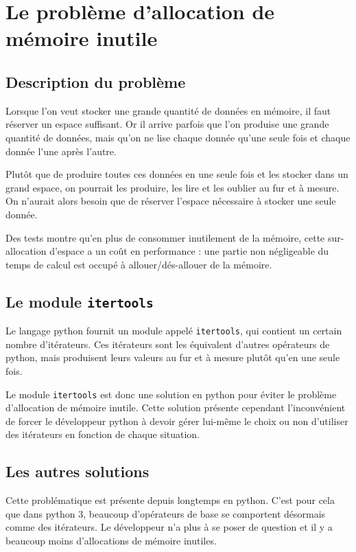 \documentclass[a4paper]{article}
\begin{document}
\section*{Le problème d'allocation de mémoire inutile}

\subsection*{Description du problème}

Lorsque l'on veut stocker une grande quantité de données en mémoire,
il faut réserver un espace suffisant. Or il arrive parfois que l'on
produise une grande quantité de données, mais qu'on ne lise chaque
donnée qu'une seule fois et chaque donnée l'une après l'autre. 

Plutôt que de produire toutes ces données en une seule fois et les
stocker dans un grand espace, on pourrait les produire, les lire et
les oublier au fur et à mesure. On n'aurait alors besoin que de
réserver l'espace nécessaire à stocker une seule donnée.

Des tests montre qu'en plus de consommer inutilement de la mémoire,
cette sur-allocation d'espace a un coût en performance : une partie non
négligeable du temps de calcul est occupé à allouer/dés-allouer de la
mémoire.

\subsection*{Le module \texttt{itertools}}

Le langage python fournit un module appelé \texttt{itertools}, qui contient un
certain nombre d'itérateurs. Ces itérateurs sont les équivalent
d'autres opérateurs de python, mais produisent leurs valeurs au fur et
à mesure plutôt qu'en une seule fois.

Le module \texttt{itertools} est donc une solution en python pour éviter le
problème d'allocation de mémoire inutile. Cette solution présente
cependant l'inconvénient de forcer le développeur python à devoir
gérer lui-même le choix ou non d'utiliser des itérateurs en fonction
de chaque situation. 

\subsection*{Les autres solutions }

Cette problématique est présente depuis longtemps en python. C'est
pour cela que dans python 3, beaucoup d'opérateurs de base se
comportent désormais comme des itérateurs. Le développeur n'a plus à
se poser de question et il y a beaucoup moins d'allocations de mémoire
inutiles.
\end{document}
